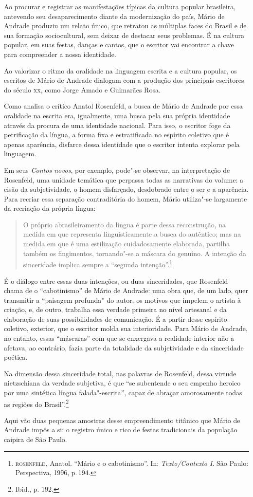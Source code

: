 Ao procurar e registrar as manifestações típicas da cultura popular brasileira, antevendo seu desaparecimento diante da modernização do país, Mário de Andrade produziu um relato único, que retratou as múltiplas faces do Brasil e de sua formação sociocultural, sem deixar de destacar seus problemas.
É na cultura popular, em suas festas, danças e cantos, que o escritor vai encontrar a chave para compreender a nossa identidade.

Ao valorizar o ritmo da oralidade na linguagem escrita e a cultura
popular, os escritos de Mário de Andrade dialogam com a produção dos
principais escritores do século \textsc{xx}, como Jorge Amado e Guimarães Rosa.

Como analisa o crítico Anatol Rosenfeld, a busca de Mário de Andrade por essa oralidade na escrita era, igualmente, uma busca pela sua própria identidade através da procura de uma identidade nacional. Para isso, o escritor foge da petrificação da língua, a forma fixa e estratificada no espírito coletivo que é apenas aparência, disfarce dessa identidade que o escritor intenta explorar pela linguagem.

Em seus \textit{Contos novos}, por exemplo, pode"-se observar, na interpretação de Rosenfeld, uma unidade temática que perpassa todas as narrativas do volume: a cisão da subjetividade, o homem disfarçado, desdobrado entre o ser e a aparência.
Para recriar essa separação contraditória do homem, Mário utiliza"-se largamente da recriação da própria língua:

\begin{quote}
O próprio abrasileiramento da língua é parte dessa reconstrução, na medida em que representa linguisticamente a busca do autêntico; mas na medida em que é uma estilização cuidadosamente elaborada, partilha também os fingimentos, tornando"-se a máscara do genuíno. A intenção da sinceridade implica sempre a ``segunda intenção''.\footnote{\textsc{rosenfeld}, Anatol. ``Mário e o cabotinismo''. In: \textit{Texto/Contexto I}. São Paulo: Perspectiva, 1996, p.\,194.}
\end{quote}

É o diálogo entre essas duas intenções, ou duas sinceridades, que Rosenfeld chama de o ``cabotinismo'' de Mário de Andrade: uma obra que, de um lado, quer transmitir a ``paisagem profunda'' do autor, os motivos que impelem o artista à criação, e, de outro, trabalha essa verdade primeira no nível artesanal e da elaboração de suas possibilidades de comunicação. É a partir desse espírito coletivo, exterior,
que o escritor molda sua interioridade. Para Mário de Andrade, no entanto, essas ``máscaras'' com que se enxergava a realidade interior não a afetava, ao contrário, fazia parte da totalidade da subjetividade e da sinceridade poética.

Na dimensão dessa sinceridade total, nas palavras de Rosenfeld, dessa virtude nietzschiana da verdade subjetiva, é que ``se subentende o seu empenho heroico por uma sintética língua falada"-escrita'', capaz de abraçar amorosamente todas as regiões do Brasil''.\footnote{Ibid., p. 192.}

Aqui vão duas pequenas amostras desse empreendimento titânico que Mário de Andrade impôs a si: o registro único e rico de festas tradicionais da população caipira de São Paulo.